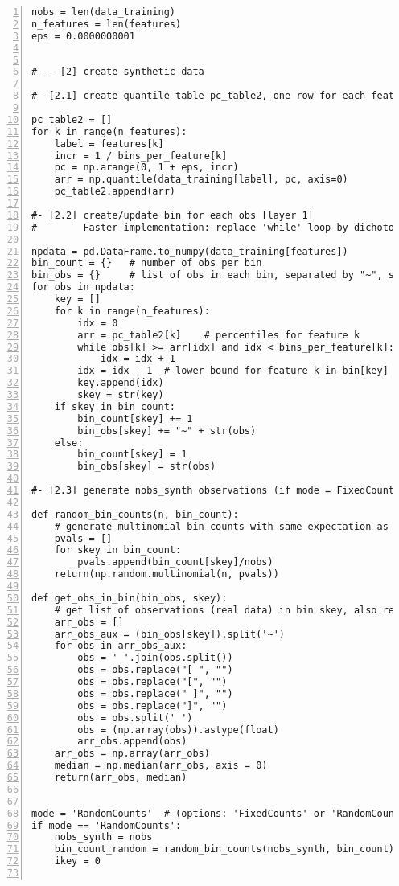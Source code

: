 \documentclass[oneside,10pt]{book}
\begin{document}
\begin{lstlisting}[numbers=left]
nobs = len(data_training)
n_features = len(features)
eps = 0.0000000001 


#--- [2] create synthetic data  

#- [2.1] create quantile table pc_table2, one row for each feature

pc_table2 = []
for k in range(n_features):
    label = features[k]
    incr = 1 / bins_per_feature[k]   
    pc = np.arange(0, 1 + eps, incr)
    arr = np.quantile(data_training[label], pc, axis=0)
    pc_table2.append(arr)

#- [2.2] create/update bin for each obs [layer 1]
#        Faster implementation: replace 'while' loop by dichotomic search

npdata = pd.DataFrame.to_numpy(data_training[features])
bin_count = {}   # number of obs per bin
bin_obs = {}     # list of obs in each bin, separated by "~", stored as a string
for obs in npdata:
    key = [] 
    for k in range(n_features):
        idx = 0
        arr = pc_table2[k]    # percentiles for feature k
        while obs[k] >= arr[idx] and idx < bins_per_feature[k]: 
            idx = idx + 1
        idx = idx - 1  # lower bound for feature k in bin[key] attached to obs
        key.append(idx)
        skey = str(key)
    if skey in bin_count:
        bin_count[skey] += 1
        bin_obs[skey] += "~" + str(obs)
    else:
        bin_count[skey] = 1
        bin_obs[skey] = str(obs)

#- [2.3] generate nobs_synth observations (if mode = FixedCounts, nobs_synth = nobs)

def random_bin_counts(n, bin_count):
    # generate multinomial bin counts with same expectation as real counts
    pvals = []
    for skey in bin_count:
        pvals.append(bin_count[skey]/nobs)
    return(np.random.multinomial(n, pvals))

def get_obs_in_bin(bin_obs, skey): 
    # get list of observations (real data) in bin skey, also return median
    arr_obs = []
    arr_obs_aux = (bin_obs[skey]).split('~')
    for obs in arr_obs_aux:
        obs = ' '.join(obs.split())
        obs = obs.replace("[ ", "")
        obs = obs.replace("[", "")
        obs = obs.replace(" ]", "")
        obs = obs.replace("]", "")
        obs = obs.split(' ')
        obs = (np.array(obs)).astype(float)
        arr_obs.append(obs)
    arr_obs = np.array(arr_obs)
    median = np.median(arr_obs, axis = 0)
    return(arr_obs, median) 

    
mode = 'RandomCounts'  # (options: 'FixedCounts' or 'RandomCounts')
if mode == 'RandomCounts':
    nobs_synth = nobs 
    bin_count_random = random_bin_counts(nobs_synth, bin_count)
    ikey = 0


\end{lstlisting}
\end{document}
